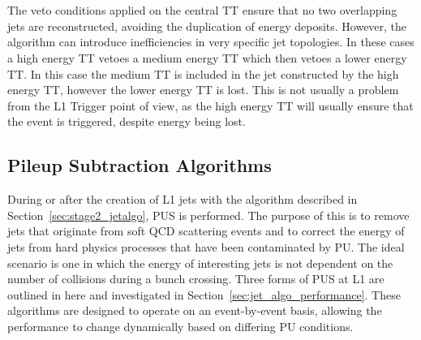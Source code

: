 \\\\
The veto conditions applied on the central TT ensure that no two overlapping jets are reconstructed, avoiding the duplication of energy deposits. However, the algorithm can introduce inefficiencies in very specific jet topologies. In these cases a high energy TT vetoes a medium energy TT which then vetoes a lower energy TT. In this case the medium TT is included in the jet constructed by the high energy TT, however the lower energy TT is lost. This is not usually a problem from the L1 Trigger point of view, as the high energy TT will usually ensure that the event is triggered, despite energy being lost.


\subsection{Pileup Subtraction Algorithms}
During or after the creation of L1 jets with the algorithm described in Section~\ref{sec:stage2_jetalgo}, PUS is performed. The purpose of this is to remove jets that originate from soft QCD scattering events and to correct the energy of jets from hard physics processes that have been contaminated by PU. The ideal scenario is one in which the energy of interesting jets is not dependent on the number of collisions during a bunch crossing. Three forms of PUS at L1 are outlined in here and investigated in Section~\ref{sec:jet_algo_performance}. These algorithms are designed to operate on an event-by-event basis, allowing the performance to change dynamically based on differing PU conditions. 

